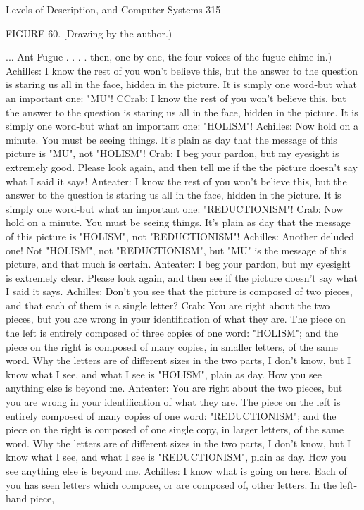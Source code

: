 Levels of Description, and Computer Systems                                          315

FIGURE 60. [Drawing by the author.)

                                    ... Ant Fugue
        . . . . then, one by one, the four voices of the fugue chime in.)
Achilles: I know the rest of you won't believe this, but the answer to the question is
   staring us all in the face, hidden in the picture. It is simply one word-but what an
   important one: "MU"!
CCrab: I know the rest of you won't believe this, but the answer to the question is staring
   us all in the face, hidden in the picture. It is simply one word-but what an important
   one: "HOLISM"!
Achilles: Now hold on a minute. You must be seeing things. It's plain as day that the
   message of this picture is "MU", not "HOLISM"!
Crab: I beg your pardon, but my eyesight is extremely good. Please look again, and then
   tell me if the the picture doesn't say what I said it says!
Anteater: I know the rest of you won't believe this, but the answer to the question is
   staring us all in the face, hidden in the picture. It is simply one word-but what an
   important one: "REDUCTIONISM"!
Crab: Now hold on a minute. You must be seeing things. It's plain as day that the
   message of this picture is "HOLISM", not "REDUCTIONISM"!
Achilles: Another deluded one! Not "HOLISM", not "REDUCTIONISM", but "MU" is
   the message of this picture, and that much is certain.
Anteater: I beg your pardon, but my eyesight is extremely clear. Please look again, and
   then see if the picture doesn't say what I said it says.
Achilles: Don't you see that the picture is composed of two pieces, and that each of them
   is a single letter?
Crab: You are right about the two pieces, but you are wrong in your identification of
   what they are. The piece on the left is entirely composed of three copies of one word:
   "HOLISM"; and the piece on the right is composed of many copies, in smaller letters,
   of the same word. Why the letters are of different sizes in the two parts, I don't know,
   but I know what I see, and what I see is "HOLISM", plain as day. How you see
   anything else is beyond me.
Anteater: You are right about the two pieces, but you are wrong in your identification of
   what they are. The piece on the left is entirely composed of many copies of one
   word: "REDUCTIONISM"; and the piece on the right is composed of one single
   copy, in larger letters, of the same word. Why the letters are of different sizes in the
   two parts, I don't know, but I know what I see, and what I see is
   "REDUCTIONISM", plain as day. How you see anything else is beyond me.
Achilles: I know what is going on here. Each of you has seen letters which compose, or
   are composed of, other letters. In the left-hand piece,




